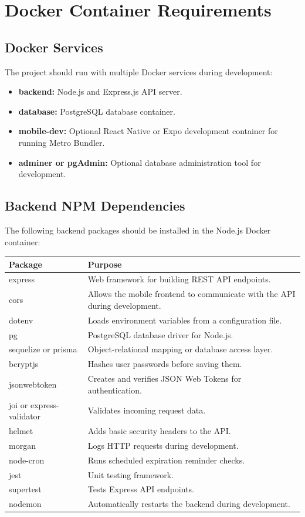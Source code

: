 \documentclass[12pt]{article}
\begin{document}
\section{Docker Container Requirements}

\subsection{Docker Services}
The project should run with multiple Docker services during development:
\begin{itemize}[leftmargin=*]
    \item \textbf{backend:} Node.js and Express.js API server.
    \item \textbf{database:} PostgreSQL database container.
    \item \textbf{mobile-dev:} Optional React Native or Expo development container for running Metro Bundler.
    \item \textbf{adminer or pgAdmin:} Optional database administration tool for development.
\end{itemize}

\subsection{Backend NPM Dependencies}
The following backend packages should be installed in the Node.js Docker container:
\begin{longtable}{|p{}|p{}|}
\hline
\textbf{Package} & \textbf{Purpose} \\
\hline
express & Web framework for building REST API endpoints. \\
\hline
cors & Allows the mobile frontend to communicate with the API during development. \\
\hline
dotenv & Loads environment variables from a configuration file. \\
\hline
pg & PostgreSQL database driver for Node.js. \\
\hline
sequelize or prisma & Object-relational mapping or database access layer. \\
\hline
bcryptjs & Hashes user passwords before saving them. \\
\hline
jsonwebtoken & Creates and verifies JSON Web Tokens for authentication. \\
\hline
joi or express-validator & Validates incoming request data. \\
\hline
helmet & Adds basic security headers to the API. \\
\hline
morgan & Logs HTTP requests during development. \\
\hline
node-cron & Runs scheduled expiration reminder checks. \\
\hline
jest & Unit testing framework. \\
\hline
supertest & Tests Express API endpoints. \\
\hline
nodemon & Automatically restarts the backend during development. \\
\hline
\end{longtable}
\end{document}
